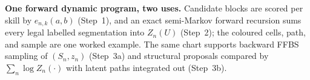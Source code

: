 \caption{\textbf{One forward dynamic program, two uses.} Candidate blocks are
scored per skill by $e_{n,k}(a,b)$ (Step~1), and an exact semi-Markov forward
recursion sums every legal labelled segmentation into $Z_n(U)$ (Step~2); the
coloured cells, path, and sample are one worked example. The same chart
supports backward FFBS sampling of $(S_n,z_n)$ (Step~3a) and structural
proposals compared by $\sum_n\log Z_n(\cdot)$ with latent paths integrated out
(Step~3b).}
\label{fig:inference}
